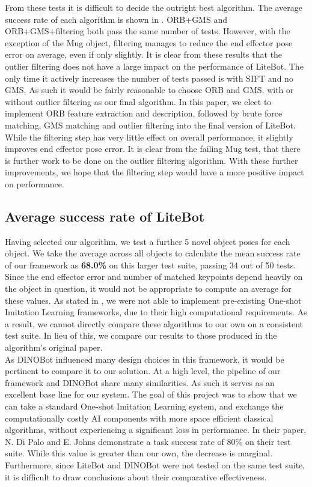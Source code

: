 From these tests it is difficult to decide the outright best algorithm. The average success rate of each algorithm is shown in . ORB+GMS and ORB+GMS+filtering both pass the same number of tests. However, with the exception of the Mug object, filtering manages to reduce the end effector pose error on average, even if only slightly. It is clear from these results that the outlier filtering does not have a large impact on the performance of LiteBot. The only time it actively increases the number of tests passed is with SIFT and no GMS. As such it would be fairly reasonable to choose ORB and GMS, with or without outlier filtering as our final algorithm. In this paper, we elect to implement ORB feature extraction and description, followed by brute force matching, GMS matching and outlier filtering into the final version of LiteBot. While the filtering step has very little effect on overall performance, it slightly improves end effector pose error. It is clear from the failing Mug test, that there is further work to be done on the outlier filtering algorithm. With these further improvements, we hope that the filtering step would have a more positive impact on performance.

\subsection{Average success rate of LiteBot}
Having selected our algorithm, we test a further 5 novel object poses for each object. We take the average across all objects to calculate the mean success rate of our framework as \textbf{68.0\%} on this larger test suite, passing 34 out of 50 tests. Since the end effector error and number of matched keypoints depend heavily on the object in question, it would not be appropriate to compute an average for these values. As stated in , we were not able to implement pre-existing One-shot Imitation Learning frameworks, due to their high computational requirements. As a result, we cannot directly compare these algorithms to our own on a consistent test suite. In lieu of this, we compare our results to those produced in the algorithm's original paper.\\

As DINOBot influenced many design choices in this framework, it would be pertinent to compare it to our solution. At a high level, the pipeline of our framework and DINOBot share many similarities. As such it serves as an excellent base line for our system. The goal of this project was to show that we can take a standard One-shot Imitation Learning system, and exchange the computationally costly AI components with more space efficient classical algorithms, without experiencing a significant loss in performance. In their paper, N. Di Palo and E. Johns \cite{one-shot-imitation} demonstrate a task success rate of 80\% on their test suite. While this value is greater than our own, the decrease is marginal. Furthermore, since LiteBot and DINOBot were not tested on the same test suite, it is difficult to draw conclusions about their comparative effectiveness.\\


